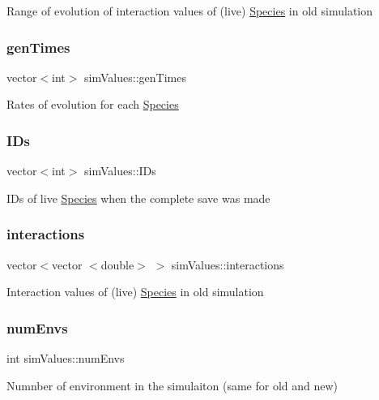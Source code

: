 Range of evolution of interaction values of (live) \hyperlink{classSpecies}{Species} in old simulation \hypertarget{structsimValues_a0c396a3dc37a1ecf668cbf0d6f52305f}{}\label{structsimValues_a0c396a3dc37a1ecf668cbf0d6f52305f} 
\subsubsection{\texorpdfstring{gen\+Times}{genTimes}}
{\footnotesize\ttfamily vector$<$int$>$ sim\+Values\+::gen\+Times}

Rates of evolution for each \hyperlink{classSpecies}{Species} \hypertarget{structsimValues_afe2312ca2bca46eac7a108d1aa9c88f0}{}\label{structsimValues_afe2312ca2bca46eac7a108d1aa9c88f0} 
\subsubsection{\texorpdfstring{I\+Ds}{IDs}}
{\footnotesize\ttfamily vector$<$int$>$ sim\+Values\+::\+I\+Ds}

I\+Ds of live \hyperlink{classSpecies}{Species} when the complete save was made \hypertarget{structsimValues_afacf91cde42df4983ac4640c6fe78470}{}\label{structsimValues_afacf91cde42df4983ac4640c6fe78470} 
\subsubsection{\texorpdfstring{interactions}{interactions}}
{\footnotesize\ttfamily vector$<$vector $<$double$>$ $>$ sim\+Values\+::interactions}

Interaction values of (live) \hyperlink{classSpecies}{Species} in old simulation \hypertarget{structsimValues_ae28b0e24d2b560548b1f4ba0eea035ee}{}\label{structsimValues_ae28b0e24d2b560548b1f4ba0eea035ee} 
\subsubsection{\texorpdfstring{num\+Envs}{numEnvs}}
{\footnotesize\ttfamily int sim\+Values\+::num\+Envs}

Numnber of environment in the simulaiton (same for old and new) \hypertarget{structsimValues_a409841bd1a747a200c99c86bfd11a78a}{}\label{structsimValues_a409841bd1a747a200c99c86bfd11a78a} 
